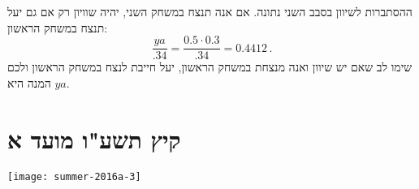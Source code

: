 ההסתברות לשיוון בסבב השני נתונה. אם אנה תנצח במשחק השני, יהיה שוויון רק אם גם יעל תנצח במשחק הראשון:
\[
\frac{ya}{.34}=\frac{0.5\cdot 0.3}{.34}=0.4412\,.
\]
שימו לב שאם יש שיוון ואנה מנצחת במשחק הראשון, יעל חייבת לנצח במשחק הראשון ולכם המנה היא 
$ya$.


\newpage

\section{קיץ תשע"ו מועד א}

\begin{center}
\texttt{[image: summer-2016a-3]}
\end{center}

